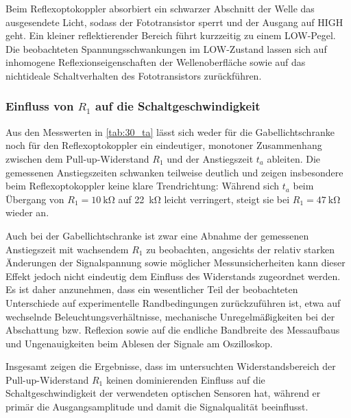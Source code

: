 Beim Reflexoptokoppler absorbiert ein schwarzer Abschnitt der Welle das ausgesendete Licht, sodass der Fototransistor sperrt und der Ausgang auf HIGH geht. Ein kleiner reflektierender Bereich führt kurzzeitig zu einem LOW-Pegel. Die beobachteten Spannungsschwankungen im LOW-Zustand lassen sich auf inhomogene Reflexionseigenschaften der Wellenoberfläche sowie auf das nichtideale Schaltverhalten des Fototransistors zurückführen.

\subsubsection{Einfluss von $R_1$ auf die Schaltgeschwindigkeit}

Aus den Messwerten in \autoref{tab:30_ta} lässt sich weder für die Gabellichtschranke noch für den Reflexoptokoppler ein eindeutiger, monotoner Zusammenhang zwischen dem Pull-up-Widerstand $R_1$ und der Anstiegszeit $t_a$ ableiten. Die gemessenen Anstiegszeiten schwanken teilweise deutlich und zeigen insbesondere beim Reflexoptokoppler keine klare Trendrichtung: Während sich $t_a$ beim Übergang von $R_1=\SI{10}{\kilo\ohm}$ auf \SI{22}{\kilo\ohm} leicht verringert, steigt sie bei $R_1=\SI{47}{\kilo\ohm}$ wieder an.

Auch bei der Gabellichtschranke ist zwar eine Abnahme der gemessenen Anstiegszeit mit wachsendem $R_1$ zu beobachten, angesichts der relativ starken Änderungen der Signalspannung sowie möglicher Messunsicherheiten kann dieser Effekt jedoch nicht eindeutig dem Einfluss des Widerstands zugeordnet werden. Es ist daher anzunehmen, dass ein wesentlicher Teil der beobachteten Unterschiede auf experimentelle Randbedingungen zurückzuführen ist, etwa auf wechselnde Beleuchtungsverhältnisse, mechanische Unregelmäßigkeiten bei der Abschattung bzw. Reflexion sowie auf die endliche Bandbreite des Messaufbaus und Ungenauigkeiten beim Ablesen der Signale am Oszilloskop.

Insgesamt zeigen die Ergebnisse, dass im untersuchten Widerstandsbereich der Pull-up-Widerstand $R_1$ keinen dominierenden Einfluss auf die Schaltgeschwindigkeit der verwendeten optischen Sensoren hat, während er primär die Ausgangsamplitude und damit die Signalqualität beeinflusst.

